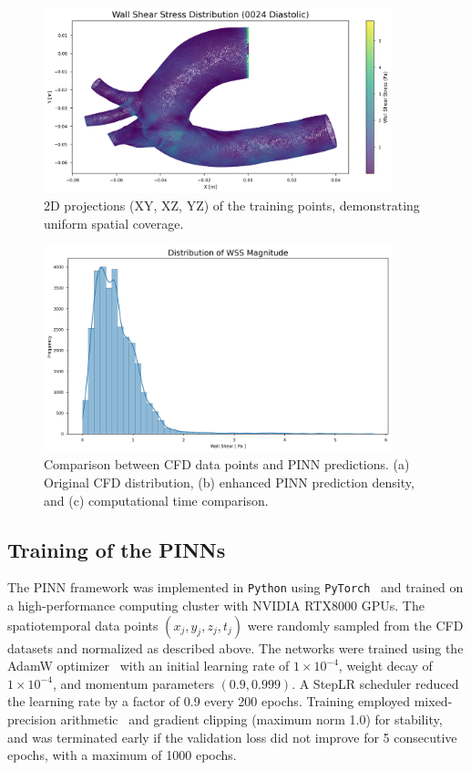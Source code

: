 \documentclass[12pt, a4paper]{article}
\begin{document}
\begin{figure}[htbp]
    \centering
    \includegraphics[width=0.9\textwidth]{0024_diastolic/wss_magnitude_distribution_0024_diastolic.png}
    \caption{2D projections (XY, XZ, YZ) of the training points, demonstrating uniform spatial coverage.}
    \label{fig:mesh_analysis}
\end{figure}

\begin{figure}[htbp]
    \centering
    \includegraphics[width=0.9\textwidth]{0024_diastolic/pressure_distribution_0024_diastolic.png}
    \caption{Comparison between CFD data points and PINN predictions. (a) Original CFD distribution, (b) enhanced PINN prediction density, and (c) computational time comparison.}
    \label{fig:density_comparison}
\end{figure}

\subsection{Training of the PINNs}
The PINN framework was implemented in \texttt{Python} using \texttt{PyTorch}~\citep{paszke2019pytorch} and trained on a high-performance computing cluster with NVIDIA RTX8000 GPUs. The spatiotemporal data points $(x_j, y_j, z_j, t_j)$ were randomly sampled from the CFD datasets and normalized as described above. The networks were trained using the AdamW optimizer~\citep{loshchilov2017decoupled} with an initial learning rate of $1 \times 10^{-4}$, weight decay of $1 \times 10^{-4}$, and momentum parameters $(0.9, 0.999)$. A StepLR scheduler reduced the learning rate by a factor of 0.9 every 200 epochs. Training employed mixed-precision arithmetic~\citep{micikevicius2017mixed} and gradient clipping (maximum norm 1.0) for stability, and was terminated early if the validation loss did not improve for 5 consecutive epochs, with a maximum of 1000 epochs.
\end{document}
